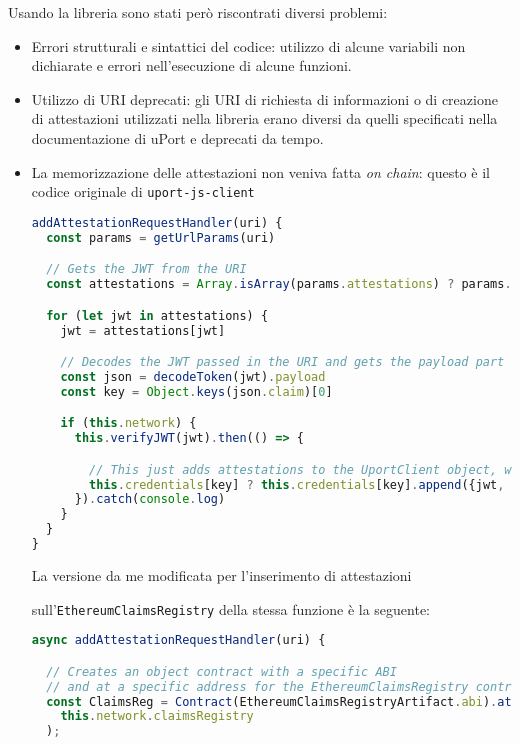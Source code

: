 Usando la libreria sono stati però riscontrati diversi problemi:

\begin{itemize}
  \item Errori strutturali e sintattici del codice: utilizzo di alcune variabili non dichiarate
  e errori nell'esecuzione di alcune funzioni.
  \item Utilizzo di URI deprecati: gli URI di richiesta di informazioni o di creazione di attestazioni utilizzati nella libreria erano
  diversi da quelli specificati nella documentazione di uPort e deprecati da tempo.
  \item La memorizzazione delle attestazioni non veniva fatta \emph{on chain}: questo è il codice originale di \texttt{uport-js-client}

  \begin{lstlisting}[language=JavaScript]
addAttestationRequestHandler(uri) {
  const params = getUrlParams(uri)

  // Gets the JWT from the URI
  const attestations = Array.isArray(params.attestations) ? params.attestations : [params.attestations]

  for (let jwt in attestations) {
    jwt = attestations[jwt]

    // Decodes the JWT passed in the URI and gets the payload part
    const json = decodeToken(jwt).payload
    const key = Object.keys(json.claim)[0]

    if (this.network) {
      this.verifyJWT(jwt).then(() => {

        // This just adds attestations to the UportClient object, while we want attestations to be stored on the blockchain
        this.credentials[key] ? this.credentials[key].append({jwt, json}) : this.credentials[key] = [{jwt, json}]
      }).catch(console.log)
    }
  }
}
  \end{lstlisting}

  La versione da me modificata per l'inserimento di attestazioni 
  
  sull'\texttt{EthereumClaimsRegistry} della stessa funzione è la seguente: 

  \begin{lstlisting}[language=JavaScript]
async addAttestationRequestHandler(uri) {

  // Creates an object contract with a specific ABI 
  // and at a specific address for the EthereumClaimsRegistry contract
  const ClaimsReg = Contract(EthereumClaimsRegistryArtifact.abi).at(
    this.network.claimsRegistry
  );


\end{lstlisting}
\end{itemize}

